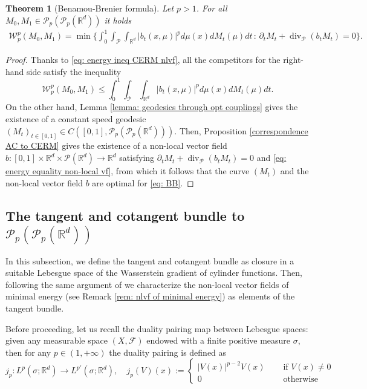\documentclass[10pt,leqno]{amsart}
\numberwithin{equation}{section}
\newtheorem{teorema}{Theorem}[section]
\newcommand{\R}{\mathbb{R}}
\newcommand{\PP}{\mathcal{P}}
\begin{document}
\begin{teorema}[Benamou-Brenier formula]\label{thm: BB2}
    Let $p>1$. For all $M_0,M_1\in \PP_p(\PP_p(\R^d))$ it holds
    \begin{equation}\label{eq: BB}
    \begin{aligned}
        \mathcal{W}_p^p(M_0,M_1) = \operatorname{min}\bigg\{ \int_0^1 \int_{\PP}\int_{\R^d} |b_t(x,\mu)|^p d\mu(x)dM_t(\mu)dt \, : \, \partial_t M_t + \operatorname{div}_\PP(b_tM_t) = 0 \bigg\}.
    \end{aligned}
    \end{equation}
\end{teorema}

\begin{proof}
    Thanks to \eqref{eq: energy ineq CERM nlvf}, all the competitors for the right-hand side satisfy the inequality 
    \[\mathcal{W}_p^p(M_0,M_1) \leq \int_0^1 \int_\PP\int_{\R^d} |b_t(x,\mu)|^p d\mu(x)dM_t(\mu)dt.\]
    On the other hand, Lemma \ref{lemma: geodesics through opt couplings} gives the existence of a constant speed geodesic $(M_t)_{t\in[0,1]}\in C([0,1],\PP_p(\PP_p(\R^d)))$. Then, Proposition \ref{correspondence AC to CERM} gives the existence of a non-local vector field $b:[0,1]\times \R^d \times \PP(\R^d) \to \R^d$ satisfying $\partial_tM_t + \operatorname{div}_\PP(b_tM_t) = 0$ and \eqref{eq: energy equality non-local vf}, from which it follows that the curve $(M_t)$ and the non-local vector field $b$ are optimal for \eqref{eq: BB}.
\end{proof}












\subsection{The tangent and cotangent bundle to $\PP_p(\PP_p(\R^d))$}\label{subsec: tangent}
In this subsection, we define the tangent and cotangent bundle as closure in a suitable Lebesgue space of the Wasserstein gradient of cylinder functions. Then, following the same argument of \cite[§8.4]{ambrosio2005gradient} we characterize the non-local vector fields of minimal energy (see Remark \ref{rem: nlvf of minimal energy}) as elements of the tangent bundle.

Before proceeding, let us recall the duality pairing map between Lebesgue spaces: given any measurable space $(X,\mathcal{F})$ endowed with a finite positive measure $\sigma$, then for any $p\in (1,+\infty)$ the duality pairing is defined as
\begin{equation}
    j_p: L^p(\sigma;\R^d) \to L^{p'}(\sigma;\R^d), \quad j_p(V)(x):= \begin{cases}
        |V(x)|^{p-2}V(x) \quad & \text{ if } V(x)\neq 0
        \\
        0 & \text{ otherwise }
    \end{cases}
\end{equation}
\end{document}
